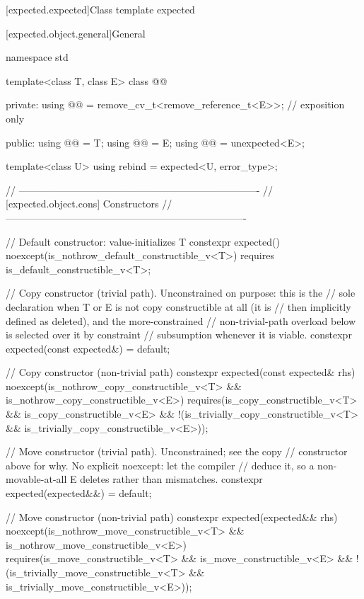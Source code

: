 [expected.expected]{Class template expected}

[expected.object.general]{General}

\begin{codeblock}
namespace std {
  template<class T, class E>
  class @@ {
  private:
    using @@ = remove_cv_t<remove_reference_t<E>>; // exposition only

  public:
    using @@ = T;
    using @@ = E;
    using @@ = unexpected<E>;

    template<class U> using rebind = expected<U, error_type>;

    // -------------------------------------------------------------------------
    // [expected.object.cons] Constructors
    // -------------------------------------------------------------------------

    // Default constructor: value-initializes T
    constexpr expected() noexcept(is_nothrow_default_constructible_v<T>)
      requires is_default_constructible_v<T>;

    // Copy constructor (trivial path). Unconstrained on purpose: this is the
    // sole declaration when T or E is not copy constructible at all (it is
    // then implicitly defined as deleted), and the more-constrained
    // non-trivial-path overload below is selected over it by constraint
    // subsumption whenever it is viable.
    constexpr expected(const expected&) = default;

    // Copy constructor (non-trivial path)
    constexpr expected(const expected& rhs) noexcept(is_nothrow_copy_constructible_v<T> &&
                                                     is_nothrow_copy_constructible_v<E>)
      requires(is_copy_constructible_v<T> && is_copy_constructible_v<E> &&
               !(is_trivially_copy_constructible_v<T> &&
                 is_trivially_copy_constructible_v<E>));

    // Move constructor (trivial path). Unconstrained; see the copy
    // constructor above for why. No explicit noexcept: let the compiler
    // deduce it, so a non-movable-at-all E deletes rather than mismatches.
    constexpr expected(expected&&) = default;

    // Move constructor (non-trivial path)
    constexpr expected(expected&& rhs) noexcept(is_nothrow_move_constructible_v<T> &&
                                                is_nothrow_move_constructible_v<E>)
      requires(is_move_constructible_v<T> && is_move_constructible_v<E> &&
               !(is_trivially_move_constructible_v<T> &&
                 is_trivially_move_constructible_v<E>));

}}
\end{codeblock}
